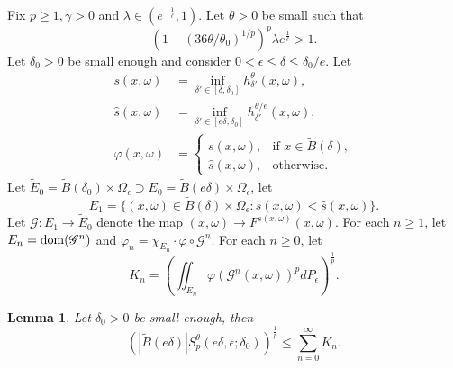 \documentclass[11pt,oneside]{article}
\theoremstyle{plain}
\newtheorem{lem}{Lemma}[section]
\numberwithin{equation}{section}
\numberwithin{figure}{section}
\numberwithin{table}{section}
\begin{document}
Fix $p \geq 1, \gamma >0$ and $\lambda \in (e^{- \frac{1}{\ell}}, 1)$. Let $\theta>0$ be small such that 
\[
(1 - (36\theta/\theta_0)^{1/p})^p \lambda e^{\frac{1}{\ell}} > 1.
\]
Let $\delta_0 >0$ be small enough and consider $0 < \epsilon \leq \delta \leq \delta_0/e$. Let 
\begin{align*}
s(x, \omega) &= \inf_{\delta' \in [\delta, \delta_0]} h_{\delta'}^{\theta} (x, \omega), \\
\hat s(x, \omega) & = \inf_{\delta' \in [e\delta, \delta_0]} h_{\delta'}^{\theta/e} (x, \omega),\\
\varphi(x, \omega) & = \begin{cases}
s(x, \omega), & \mbox{if \ } x \in \tilde B(\delta),\\
\hat s(x, \omega), & \mbox{otherwise}.
\end{cases}
\end{align*}
Let $\tilde E_0 = \tilde B(\delta_0) \times \Omega_{\epsilon} \supset E_0 = \tilde B(e\delta) \times \Omega_{\epsilon} $, let 
\[
E_1 = \{(x, \omega) \in  \tilde B(\delta) \times \Omega_{\epsilon}: s(x, \omega) < \hat s(x, \omega) \}.
\]
Let $\mathscr G: E_1 \to \tilde E_0$ denote the map $(x, \omega) \to F^{s(x, \omega)} (x, \omega)$. For each $n \geq 1$, let $E_n = {\rm dom}(\mathscr G^n)$ and $\varphi_n = \chi_{E_n} \cdot \varphi \circ \mathscr G^n$. For each $n \geq 0$, let
\[
K_n = \left( \iint_{E_n} \varphi (\mathscr G^n(x, \omega))^p d P_{\epsilon}  \right)^{\frac{1}{p}}.
\]


\begin{lem}

Let $\delta_0 > 0$ be small enough, then
\[
\left( |\tilde B(e \delta)| S_p^{\theta} (e\delta, \epsilon; \delta_0) \right)^{\frac{1}{p}} \leq \sum_{n=0}^{\infty} K_n.
\]

\end{lem}
\end{document}
